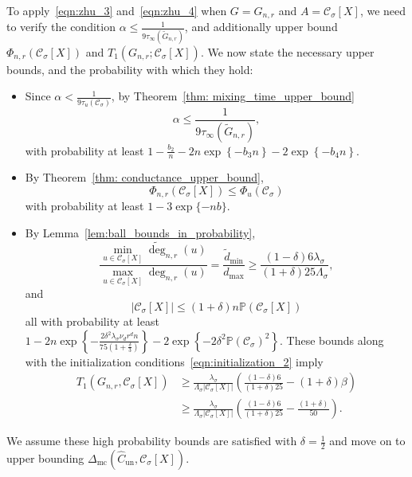 \documentclass[11pt,twoside]{article}
\theoremstyle{definition}
\newcommand{\set}[1]{\left\{#1\right\}}
\newcommand{\abs}[1]{\left \lvert #1 \right \rvert}
\newcommand{\1}{\mathbbm{1}}
\newcommand{\Phibf}{\Phi_{u}}
\newcommand{\Xbf}{X}
\newcommand{\Pbb}{\mathbb{P}}
\newcommand{\Cset}{\mathcal{C}}
\newcommand{\Csig}{\Cset_{\sigma}}
\newcommand{\Cest}{\widehat{C}}
\newcommand{\degminwt}{\widetilde{d}_{\min}}
\newcommand{\degmax}{d_{\max}}
\begin{document}
To apply~\eqref{eqn:zhu_3} and~\eqref{eqn:zhu_4} when $G = G_{n,r}$ and $A = \Csig[\Xbf]$, we need to verify the condition $\alpha \leq \frac{1}{9\tau_{\infty}(\widetilde{G}_{n,r})}$, and additionally upper bound $\Phi_{n,r}(\Csig[\Xbf])$ and $T_1(G_{n,r}; \Csig[\Xbf])$. We now state the necessary upper bounds, and the probability with which they hold:
\begin{itemize}
	\item Since $\alpha < \frac{1}{9\tau_u(\Csig)}$, by Theorem~\ref{thm: mixing_time_upper_bound} 
	\begin{equation*}
	\alpha \leq \frac{1}{9\tau_{\infty}(\widetilde{G}_{n,r})},
	\end{equation*}
	with probability at least $1 - \frac{b_2}{n} - 2n\exp\set{-b_3n} - 2\exp\set{-b_4n}$. 
	\item  By Theorem~\ref{thm: conductance_upper_bound}, 
	\begin{equation*}
	\Phi_{n,r}(\Csig[\Xbf]) \leq \Phibf(\Csig) 
	\end{equation*}
	with probability at least $1 - 3\exp\{-nb\}$. 
	\item By Lemma~\ref{lem:ball_bounds_in_probability},
	\begin{equation*}
	\frac{\min_{u \in \Csig[\Xbf]}\widetilde{\deg}_{n,r}(u)}{\max_{u \in \Csig[\Xbf]}\deg_{n,r}(u)}= \frac{\degminwt}{\degmax} \geq \frac{(1 - \delta)6\lambda_{\sigma}}{(1+\delta)25\Lambda_{\sigma}},
	\end{equation*}
	and
	\begin{equation*}
	\abs{\Csig[\Xbf]} \leq (1 + \delta)n\Pbb(\Csig[\Xbf])
	\end{equation*}
	all with probability at least $1 - 2n\exp\set{-\frac{2 \delta^2 \lambda_{\sigma} \nu_d r^d n}{75(1 + \frac{\delta}{3})}} - 2\exp\set{-2\delta^2 \Pbb(\Csig)^2}$. These bounds along with the initialization conditions~\eqref{eqn:initialization_2} imply
	\begin{align}
	T_1(G_{n,r}, \Csig[\Xbf]) & \geq \frac{\lambda_{\sigma}}{\Lambda_{\sigma}\abs{\Csig[\Xbf]}}\left(\frac{(1 - \delta)6}{(1+\delta)25} - (1 + \delta)\beta\right) \nonumber \\
	& \geq \frac{\lambda_{\sigma}}{\Lambda_{\sigma}\abs{\Csig[\Xbf]}}\left(\frac{(1 - \delta)6}{(1+\delta)25} - \frac{(1 + \delta)}{50}\right). \label{eqn:misclassification_rate_pf1}
	\end{align}
\end{itemize}
We assume these high probability bounds are satisfied with $\delta = \frac{1}{2}$ and move on to upper bounding $\Delta_{\textrm{mc}}(\Cest_{\textrm{un}}, \Csig[\Xbf])$. 
\end{document}
